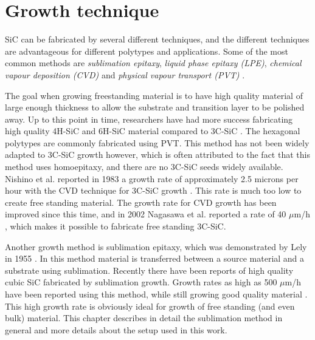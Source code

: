 \chapter{Growth technique}
\label{sec:growth}

	

SiC can be fabricated by several different techniques, and the different techniques are advantageous for different polytypes and applications. Some of the most common methods are \emph{sublimation epitaxy}, \emph{liquid phase epitaxy (LPE)}, \emph{chemical vapour deposition (CVD)} and \emph{physical vapour transport (PVT)} \cite{Ivanov1999}. 

The goal when growing freestanding material is to have high quality material of large enough thickness to allow the substrate and transition layer to be polished away. Up to this point in time, researchers have had more success fabricating high quality 4H-SiC and 6H-SiC material compared to 3C-SiC \cite{J.B.CASADYandR.W.JOHNSON1996}. The hexagonal polytypes are commonly fabricated using PVT. This method has not been widely adapted to 3C-SiC growth however, which is often attributed to the fact that this method uses homoepitaxy, and there are no 3C-SiC seeds widely available. Nishino et al. reported in 1983 a growth rate of approximately 2.5 microns per hour with the CVD technique for 3C-SiC growth \cite{Nishino1983}. This rate is much too low to create free standing material. The growth rate for CVD growth has been improved since this time, and in 2002 Nagasawa et al. reported a rate of 40 $\mu$m/h \cite{Nagasawa2002}, which makes it possible to fabricate free standing 3C-SiC. 

Another growth method is sublimation epitaxy, which was demonstrated by Lely in 1955 \cite{Lely1955}. In this method material is transferred between a source material and a substrate using sublimation. Recently there have been reports of high quality cubic SiC fabricated by sublimation growth. Growth rates as high as 500 $\mu$m/h have been reported using this method, while still growing good quality material \cite{Jokubavicius2014}. This high growth rate is obviously ideal for growth of free standing (and even bulk) material. This chapter describes in detail the sublimation method in general and more details about the setup used in this work. 
 
